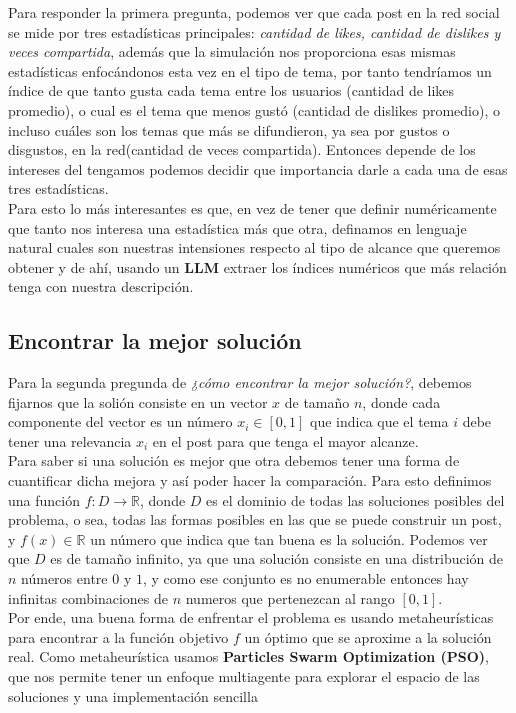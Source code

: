 \documentclass[acmtog]{acmart}
\begin{document}
Para responder la primera pregunta, podemos ver que cada post en la red social se mide por tres estadísticas principales: \textit{cantidad de likes, cantidad de dislikes y veces compartida}, además que
la simulación nos proporciona esas mismas estadísticas enfocándonos esta vez en el tipo de tema, por tanto tendríamos un índice de que tanto gusta cada tema entre los usuarios (cantidad de likes promedio),
o cual es el tema que menos gustó (cantidad de dislikes promedio), o incluso cuáles son los temas que más se difundieron, ya sea por gustos o disgustos, en la red(cantidad de veces compartida). Entonces depende
de los intereses del tengamos podemos decidir que importancia darle a cada una de esas tres estadísticas.
\\
Para esto lo más interesantes es que, en vez de tener que definir numéricamente que tanto nos interesa una estadística más que otra, definamos en lenguaje natural cuales son nuestras intensiones respecto al tipo 
de alcance que queremos obtener y de ahí, usando un \textbf{LLM} extraer los índices numéricos que más relación tenga con nuestra descripción.


\subsection{Encontrar la mejor solución}

Para la segunda pregunda de \textit{¿cómo encontrar la mejor solución?}, debemos fijarnos que la solión consiste en un vector $x$ de tamaño $n$, donde cada componente del vector es un número $x_i \in [0,1]$ que
indica que el tema $i$ debe tener una relevancia $x_i$ en el post para que tenga el mayor alcanze.
\\
Para saber si una solución es mejor que otra debemos tener una forma de cuantificar dicha mejora y así poder hacer la comparación. Para esto definimos una función $f: D \rightarrow \mathbb{R}$, donde $D$ es
el dominio de todas las soluciones posibles del problema, o sea, todas las formas posibles en las que se puede construir un post, y $f(x) \in \mathbb{R}$ un número que indica que tan buena es la solución. 
Podemos ver que $D$ es de tamaño infinito, ya que una solución consiste en una distribución de $n$ números entre $0$ y $1$, y como ese conjunto es no enumerable entonces hay infinitas combinaciones de $n$ numeros
que pertenezcan al rango $[0, 1]$.
\\
Por ende, una buena forma de enfrentar el problema es usando metaheurísticas para encontrar a la función objetivo $f$ un óptimo que se aproxime a la solución real. Como metaheurística usamos \textbf{Particles Swarm Optimization (PSO)}, que nos permite tener un enfoque multiagente para explorar el espacio de las soluciones y una implementación sencilla 
\end{document}
